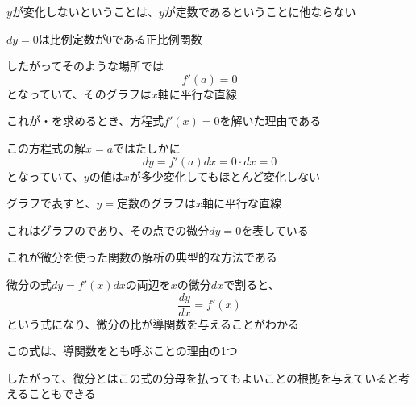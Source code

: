 \documentclass[../book_infinite_continuous_math]{subfiles}
\begin{document}
$y$が変化しないということは、$y$が定数であるということに他ならない

\br

$dy=0$は比例定数が$0$である正比例関数

したがってそのような場所では
\begin{equation*}
  f'(a) = 0
\end{equation*}
となっていて、そのグラフは$x$軸に平行な直線

これが・を求めるとき、方程式$f'(x) = 0$を解いた理由である

この方程式の解$x=a$ではたしかに
\begin{equation*}
  dy = f'(a)dx = 0 \cdot dx = 0
\end{equation*}
となっていて、$y$の値は$x$が多少変化してもほとんど変化しない

\br

グラフで表すと、$y=\text{定数}$のグラフは$x$軸に平行な直線

これはグラフのであり、その点での微分$dy=0$を表している

これが微分を使った関数の解析の典型的な方法である

\br

微分の式$dy = f'(x)dx$の両辺を$x$の微分$dx$で割ると、
\begin{equation*}
  \dfrac{dy}{dx} = f'(x)
\end{equation*}
という式になり、微分の比が導関数を与えることがわかる

この式は、導関数をとも呼ぶことの理由の1つ

したがって、微分とはこの式の分母を払ってもよいことの根拠を与えていると考えることもできる
\end{document}
